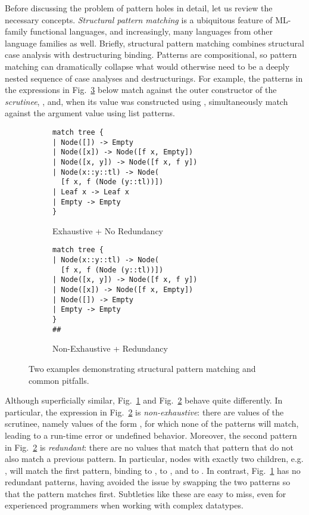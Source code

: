 Before discussing the problem of pattern holes in detail, let us review the necessary concepts. 
\emph{Structural pattern matching} is a ubiquitous feature of ML-family functional languages, 
and increasingly, many languages from other language families as well. Briefly,
structural pattern matching combines structural case analysis with destructuring binding. 
Patterns are compositional, so pattern matching can dramatically collapse what would otherwise 
need to be a deeply nested sequence of case analyses and destructurings. For example,
the patterns in the  expressions in Fig.~\ref{fig:basic-examples} below 
match against the outer constructor of the \emph{scrutinee}, , and, when its value was constructed using , simultaneously match against the argument value using list patterns.
\begin{figure}[h!]
\begin{subfigure}{.45\textwidth}
\begin{lstlisting}[numbers=none]
match tree {
| Node([]) -> Empty
| Node([x]) -> Node([f x, Empty])
| Node([x, y]) -> Node([f x, f y])
| Node(x::y::tl) -> Node(
  [f x, f (Node (y::tl))])
| Leaf x -> Leaf x
| Empty -> Empty
}
\end{lstlisting}
\caption{Exhaustive + No Redundancy\label{fig:basic-examples-correct}}
\end{subfigure}
\begin{subfigure}{.5\textwidth}
\begin{lstlisting}[numbers=none]
match tree {
| Node(x::y::tl) -> Node(
  [f x, f (Node (y::tl))])
| Node([x, y]) -> Node([f x, f y])
| Node([x]) -> Node([f x, Empty])
| Node([]) -> Empty
| Empty -> Empty
}
##
\end{lstlisting}
\caption{Non-Exhaustive + Redundancy\label{fig:basic-examples-wrong}}
\end{subfigure}
\caption{Two examples demonstrating structural pattern matching and common pitfalls.}
\label{fig:basic-examples}
\end{figure}

Although superficially similar, Fig.~\ref{fig:basic-examples-correct} and Fig.~\ref{fig:basic-examples-wrong}
behave quite differently. In particular, the  expression in Fig.~\ref{fig:basic-examples-wrong} is \emph{non-exhaustive}: there are values of the scrutinee, namely values of the form , for which none of the patterns will match, leading to a run-time error or undefined behavior. 
Moreover, the second pattern in Fig.~\ref{fig:basic-examples-wrong} is \emph{redundant}: there are no values that match that pattern that do not also match a
previous pattern. In particular, nodes with exactly two children, e.g. , will match the first pattern, 
binding  to ,  to , and  to \li{[]}.
In contrast, Fig.~\ref{fig:basic-examples-correct} has no redundant patterns, having avoided the issue by swapping the two patterns so that the pattern  matches first.
Subtleties like these are easy to miss, even for experienced programmers when working with complex datatypes. 

